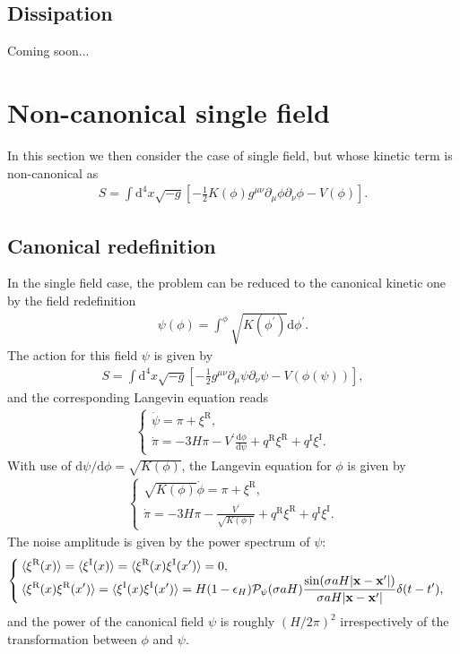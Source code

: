 \documentclass[aps, prd
, preprint
, nofootinbib 
]{revtex4-1}
\newcommand{\dif}[2]{\frac{\mathrm{d} #1}{\mathrm{d} #2}}
\newcommand{\dd}{\mathrm{d}}
\newcommand{\calP}{\mathcal{P}}
\newcommand{\bae}[1]{\begin{align} #1 \end{align}}
\newcommand{\bce}[1]{\begin{cases} #1 \end{cases}}
\begin{document}
\subsection{Dissipation}

Coming soon...





\section{Non-canonical single field}

In this section we then consider the case of single field, but whose kinetic term is non-canonical as
\bae{
	S=\int\dd^4x\sqrt{-g}\left[-\frac{1}{2}K(\phi)g^{\mu\nu}\partial_\mu\phi\partial_\nu\phi-V(\phi)\right].
}


\subsection{Canonical redefinition}

In the single field case, the problem can be reduced to the canonical kinetic one by the field redefinition
\bae{
	\psi(\phi)=\int^\phi\sqrt{K(\phi^\prime)}\dd\phi^\prime.
}
The action for this field $\psi$ is given by
\bae{
	S=\int\dd^4x\sqrt{-g}\left[-\frac{1}{2}g^{\mu\nu}\partial_\mu\psi\partial_\nu\psi-V(\phi(\psi))\right],
}
and the corresponding Langevin equation reads
\bae{
	\bce{
		\displaystyle
		\dot{\psi}=\pi+\xi^\text{R}, \\
		\displaystyle
		\dot{\pi}=-3H\pi-V^\prime\dif{\phi}{\psi}+q^\text{R}\xi^\text{R}+q^\text{I}\xi^\text{I}.
	}
}
With use of $\dd\psi/\dd\phi=\sqrt{K(\phi)}$, the Langevin equation for $\phi$ is given by
\bae{\label{eq: Langevin for non-canonical by field redefinition}
	\bce{
		\displaystyle
		\sqrt{K(\phi)}\dot{\phi}=\pi+\xi^\text{R}, \\
		\displaystyle
		\dot{\pi}=-3H\pi-\frac{V^\prime}{\sqrt{K(\phi)}}+q^\text{R}\xi^\text{R}+q^\text{I}\xi^\text{I}.
	}
}
The noise amplitude is given by the power spectrum of $\psi$:
\bae{
	\bce{
		\displaystyle
		\braket{\xi^\text{R}(x)}=\braket{\xi^\text{I}(x)}=\braket{\xi^\text{R}(x)\xi^\text{I}(x^\prime)}=0, \\
		\displaystyle
		\braket{\xi^\text{R}(x)\xi^\text{R}(x^\prime)}=\braket{\xi^\text{I}(x)\xi^\text{I}(x^\prime)}=H(1-\epsilon_H)\calP_\psi(\sigma aH)
		\frac{\sin(\sigma aH|\mathbf{x}-\mathbf{x}^\prime|)}{\sigma aH|\mathbf{x}-\mathbf{x}^\prime|}\delta(t-t^\prime),
	}
}
and the power of the canonical field $\psi$ is roughly $(H/2\pi)^2$ irrespectively of the transformation between $\phi$ and $\psi$.
\end{document}
